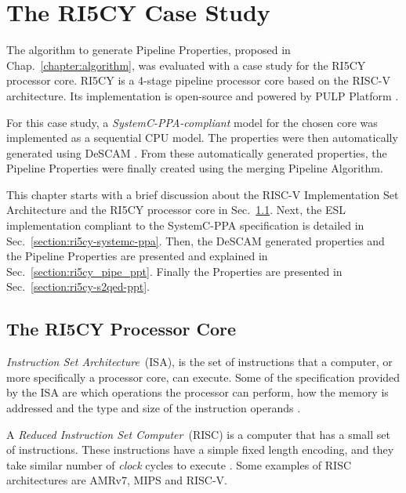 \chapter{The RI5CY Case Study}
\label{chapter:ri5cy}

The algorithm to generate Pipeline Properties, proposed in Chap.~\ref{chapter:algorithm},  was evaluated with a case study for the RI5CY processor core. RI5CY is a 4-stage pipeline processor core based on the RISC-V architecture. Its implementation is open-source and powered by PULP Platform \cite{pulp}  .

For this case study, a \textit{SystemC-PPA-compliant} \cite{paper-pdd} model for the chosen core was implemented as a sequential CPU model. The properties were then automatically generated using DeSCAM \cite{descam}. From these automatically generated properties, the Pipeline Properties were finally created using the merging Pipeline Algorithm. 

This chapter starts with a brief discussion about the RISC-V Implementation Set Architecture and the RI5CY processor core in Sec.~\ref{section:ri5cy_core}. Next, the ESL implementation compliant to the SystemC-PPA specification is detailed in Sec.~\ref{section:ri5cy-systemc-ppa}. Then, the DeSCAM generated properties and the Pipeline Properties are presented and explained in Sec.~\ref{section:ri5cy_pipe_ppt}. Finally the \SSQED{} Properties are presented in Sec.~\ref{section:ri5cy-s2qed-ppt}.

\section{The RI5CY Processor Core}
\label{section:ri5cy_core}

\textit{Instruction Set Architecture}~(ISA), is the set of instructions that a computer, or more specifically a processor core, can execute. Some of the specification provided by the ISA are which operations the processor can perform, how the memory is addressed and the type and size of the instruction operands \cite{book-comp-arch}.

A \textit{Reduced Instruction Set Computer}~(RISC) is a computer that has a small set of instructions. These instructions have a simple fixed length encoding, and they take similar number of \textit{clock} cycles to execute \cite{book-comp-arch}. Some examples of RISC architectures are AMRv7, MIPS and RISC-V.

